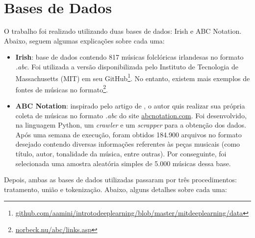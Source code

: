 \documentclass[twoside]{automatextcc}
\begin{document}
\section{Bases de Dados}
O trabalho foi realizado utilizando duas bases de dados: Irish e ABC Notation. Abaixo, seguem algumas explicações sobre cada uma:
\begin{itemize}
    \item \textbf{Irish}: base de dados contendo 817 músicas folclóricas irlandesas no formato \textit{.abc}. Foi utilizada a versão disponibilizada pelo Instituto de Tecnologia de Massachusetts (MIT) em seu GitHub\footnote{\href{https://github.com/aamini/introtodeeplearning/blob/master/mitdeeplearning/data/irish.abc}{\url{github.com/aamini/introtodeeplearning/blob/master/mitdeeplearning/data}}}. No entanto, existem mais exemplos de fontes de músicas no formato\footnote{\href{https://www.norbeck.nu/abc/links.asp}{\url{norbeck.nu/abc/links.asp}}}.
    \item \textbf{ABC Notation}: inspirado pelo artigo de \citet{agarwala2017}, o autor quis realizar sua própria coleta de músicas no formato \textit{.abc} do site \href{https://abcnotation.com/}{abcnotation.com}. Foi desenvolvido, na linguagem Python, um \textit{crawler} e um \textit{scrapper} para a obtenção dos dados. Após uma semana de execução, foram obtidos 184.900 arquivos no formato desejado contendo diversas informações referentes às peças musicais (como título, autor, tonalidade da música, entre outras). Por conseguinte, foi selecionada uma amostra aleatória simples de 5.000 músicas dessa base.
\end{itemize}
Depois, ambas as bases de dados utilizadas passaram por três procedimentos: tratamento, união e tokenização. Abaixo, alguns detalhes sobre cada uma:
\end{document}
